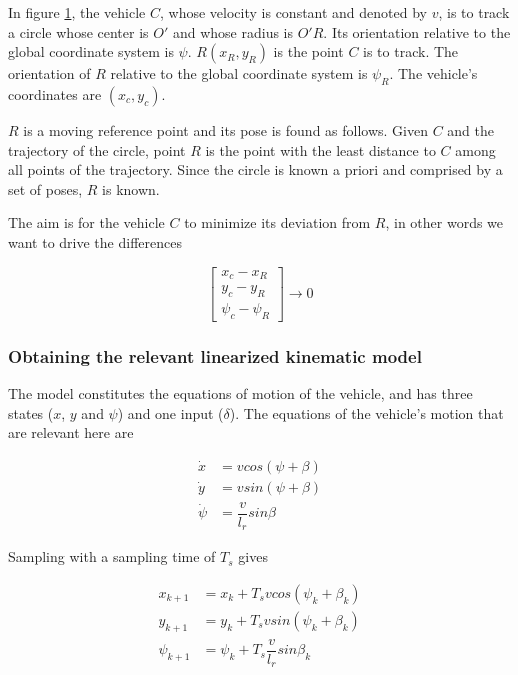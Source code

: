 In figure \ref{fig:circular_mpc}, the vehicle $C$, whose velocity is constant
and denoted by $v$, is to track a circle whose center is $O'$ and whose
radius is $O'R$. Its orientation relative to the global coordinate system is
$\psi$. $R(x_R, y_R)$ is the point $C$ is to track. The orientation of $R$
relative to the global coordinate system is $\psi_R$. The vehicle's coordinates
are $(x_c, y_c)$.


\begin{figure}[H]\centering
  \scalebox{0.8}{}
  \caption{}
  \label{fig:circular_mpc}
\end{figure}

$R$ is a moving reference point and its pose is found as follows. Given $C$ and
the trajectory of the circle, point $R$ is the point with the least distance
to $C$ among all points of the trajectory. Since the circle is known a priori
and comprised by a set of poses, $R$ is known.

The aim is for the vehicle $C$ to minimize its deviation from $R$, in other
words we want to drive the differences

\begin{equation}
  \begin{bmatrix}
    x_c - x_R \\
    y_c -y_R\\
    \psi_c - \psi_R
  \end{bmatrix}
  \rightarrow 0
\end{equation}

\subsubsection{Obtaining the relevant linearized kinematic model}

The model constitutes the equations of motion of the vehicle, and has three
states ($x$, $y$ and $\psi$) and one input ($\delta$). The equations of the
vehicle's motion that are relevant here are

\begin{align}
  \dot{x} &= v cos(\psi + \beta) \\
  \dot{y} &= v sin(\psi + \beta) \\
  \dot{\psi} &= \dfrac{v}{l_r} sin\beta
\end{align}

Sampling with a sampling time of $T_s$ gives

\begin{align}
  x_{k+1} &= x_{k} + T_s v cos(\psi_k + \beta_k) \\
  y_{k+1} &= y_{k} + T_s v sin(\psi_k + \beta_k) \\
  \psi_{k+1} &= \psi_{k} + T_s \dfrac{v}{l_r} sin\beta_k
\end{align}

